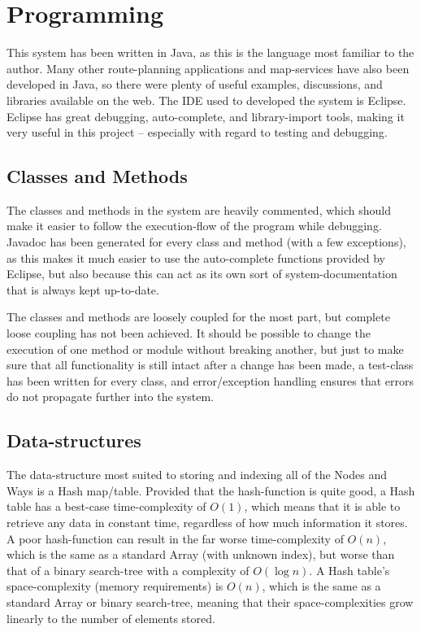 \newpage
\section{Programming}
This system has been written in Java, as this is the language most familiar to the author. Many other route-planning applications and map-services have also been developed in Java, so there were plenty of useful examples, discussions, and libraries available on the web.
The IDE used to developed the system is Eclipse\cite{Eclipse_License}. Eclipse has great debugging, auto-complete, and library-import tools, making it very useful in this project -- especially with regard to testing and debugging.

\subsection{Classes and Methods}

The classes and methods in the system are heavily commented, which should make it easier to follow the execution-flow of the program while debugging. Javadoc has been generated for every class and method (with a few exceptions), as this makes it much easier to use the auto-complete functions provided by Eclipse, but also because this can act as its own sort of system-documentation that is always kept up-to-date.

The classes and methods are loosely coupled for the most part, but complete loose coupling has not been achieved. It should be possible to change the execution of one method or module without breaking another, but just to make sure that all functionality is still intact after a change has been made, a test-class has been written for every class, and error/exception handling ensures that errors do not propagate further into the system.

\subsection{Data-structures}
The data-structure most suited to storing and indexing all of the Nodes and Ways is a Hash map/table. Provided that the hash-function is quite good, a Hash table has a best-case time-complexity of $O(1)$, which means that it is able to retrieve any data in constant time, regardless of how much information it stores. A poor hash-function can result in the far worse time-complexity of $O(n)$, which is the same as a standard Array (with unknown index), but worse than that of a binary search-tree with a complexity of $O(\log n)$. A Hash table's space-complexity (memory requirements) is $O(n)$, which is the same as a standard Array or binary search-tree, meaning that their space-complexities grow linearly to the number of elements stored. \cite{BigOCheatSheet}

